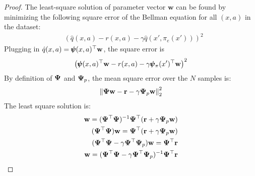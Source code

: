 \documentclass{article}
\begin{document}
\begin{proof}
The least-square solution of parameter vector $\mathbf{w}$ can be found by minimizing the following square error of the Bellman equation for all $(x,a)$ in the dataset:
\begin{align}
    &\left(\hat{q}(x,a) - r(x,a) - \gamma \hat{q}(x', \pi_e(x')) \right)^2 
\end{align}
Plugging in $\hat{q}(x,a) = \pmb{\psi}(x,a)^\top \mathbf{w}$, the square error is
\begin{align}
    \left( \pmb{\psi}(x,a)^\top \mathbf{w} - r(x,a) - \gamma \pmb{\psi}_{\pi}(x')^\top \mathbf{w}\right)^2
\end{align}
By definition of $\mathbf{\Psi}$ and $\mathbf{\Psi}_p$, the mean square error over the $N$ samples is:
\begin{align}
    \left\| \mathbf{\Psi}\mathbf{w} - \mathbf{r} - \gamma \mathbf{\Psi}_p \mathbf{w}\right\|_2^2
\end{align}
The least square solution is:
\begin{align}
    \mathbf{w} = (\mathbf{\Psi}^\top \mathbf{\Psi})^{-1}\mathbf{\Psi}^\top (\mathbf{r} + \gamma \mathbf{\Psi}_p \mathbf{w}) \\
    (\mathbf{\Psi}^\top \mathbf{\Psi}) \mathbf{w} =\mathbf{\Psi}^\top (\mathbf{r} + \gamma \mathbf{\Psi}_p \mathbf{w})\\
    (\mathbf{\Psi}^\top \mathbf{\Psi} - \gamma \mathbf{\Psi}^\top \mathbf{\Psi}_p) \mathbf{w} =\mathbf{\Psi}^\top \mathbf{r} \\
    \mathbf{w} = (\mathbf{\Psi}^\top \mathbf{\Psi} - \gamma \mathbf{\Psi}^\top \mathbf{\Psi}_p)^{-1}\mathbf{\Psi}^\top \mathbf{r}
\end{align}

\end{proof}
\end{document}
